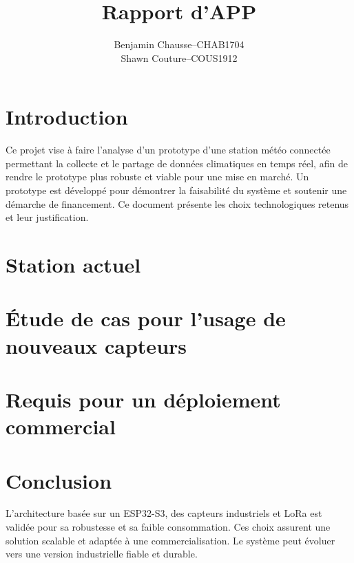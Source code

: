 \documentclass[a4paper]{article}
\title{Rapport d'APP}
\author{
  \addtolength{\tabcolsep}{-0.4em}
  \begin{tabular}{rcl}
      Benjamin Chausse & -- & CHAB1704 \\
      Shawn Couture    & -- & COUS1912 \\
  \end{tabular}
}
\makeatletter
\let\title\@title
\makeatother
\begin{document}
\maketitle
\contents{
\tableofcontents
}
\pagestyle{fancy}
\fancyhf{} %
\fancyhead[L]{\footnotesize \title}
\fancyfoot[C]{\thepage}
\renewcommand{\headrulewidth}{0.4pt} %
\renewcommand{\footrulewidth}{0pt}

\section{Introduction}
Ce projet vise à faire l'analyse d'un prototype d'une station météo connectée permettant la collecte et le partage de données climatiques
en temps réel, afin de rendre le prototype plus robuste et viable pour une mise en marché.
Un prototype est développé pour démontrer la faisabilité du système et soutenir une démarche de financement. Ce document présente les
choix technologiques retenus et leur justification.


\section{Station actuel}


\section{Étude de cas pour l'usage de nouveaux capteurs}


\section{Requis pour un déploiement commercial}


\section{Conclusion}
L'architecture basée sur un ESP32-S3, des capteurs industriels et
LoRa est validée pour sa robustesse et sa faible consommation.
Ces choix assurent une solution scalable et adaptée à une commercialisation.
Le système peut évoluer vers une version industrielle fiable et durable.

% 
\end{document}
